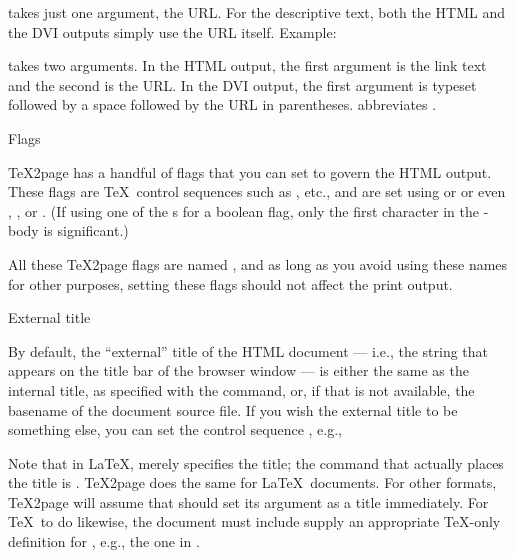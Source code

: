 \p{\url} takes just one argument, the URL.  For the
descriptive text, both the HTML and the DVI outputs simply
use the URL itself.   Example:


\p{\urlp} takes two arguments.  In the HTML output,
the first argument is the link text and the second is
the URL.  In the DVI output, the first argument is
typeset followed by a space followed by the URL in
parentheses.   abbreviates
.

 Flags

%
\TeX2page has a handful of flags that you can set to govern the HTML output.
These flags are \TeX\ control sequences such as \p{\TZPcolophontimestamp},
etc., and are set using \p{\let} or \p{\def} or even \p{\gdef},
\p{\edef}, or \p{\xdef}.
(If using one of the \p{\def}s for a boolean flag, only the
first character in the \p{\def}-body is significant.)

All these \TeX2page flags are named , and as long as
you avoid using these names for other purposes, setting these
flags should not affect the print output.

\beginsection External title

%
By default, the ``external'' title of the HTML document ---
i.e., the string that appears on the title bar of the
browser window --- is either the same as the internal title,
as specified with the \p{\title} command, or, if that is not
available, the basename of the document source file.  If you
wish the external title to be something else, you can set
the control sequence \p{\TZPtitle}, e.g.,


\n Note that in \LaTeX, \p{\title} merely
specifies the title; the command that actually places the
title is \p{\maketitle}.  \TeX2page does the same for \LaTeX\
documents.  For other formats, \TeX2page will assume that
\p{\title}  should set its argument as a title immediately.
For \TeX\ to do likewise, the document must include supply an
appropriate \TeX-only definition for \p{\title}, e.g., the
one in .


